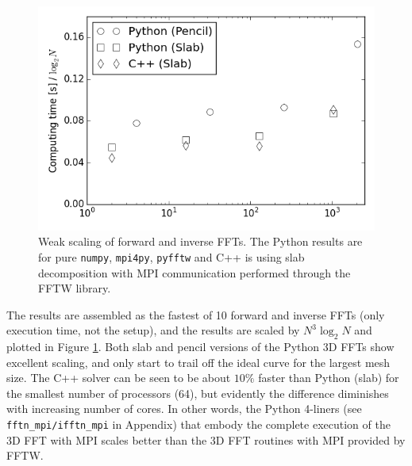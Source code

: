 \documentclass[11pt, oneside]{article}
\newcommand{\inpyth}{\lstinline[keywordstyle={}, basicstyle=\ttfamily]} %[]%
\begin{document}


\begin{figure}
\centering
\includegraphics[scale=0.6]{figs/weak_scaling_fft_1024.png}
\caption{Weak scaling of forward and inverse FFTs. The Python results are for pure \texttt{numpy}, \texttt{mpi4py}, \texttt{pyfftw} and C++ is using slab decomposition with MPI communication performed through the FFTW library.}
\label{fig:weak_FFT_scaling}
\end{figure}

The results are assembled as the fastest of 10 forward and inverse FFTs (only execution time, not the setup), and the results
are scaled by $N^3 \log_2N$ and plotted in Figure \ref{fig:weak_FFT_scaling}. Both slab and pencil versions of the Python 3D FFTs show excellent scaling,
and only start to trail off the ideal curve for the largest mesh size. The C++ solver can be seen to be about $10 \%$ faster than Python (slab) for the smallest number of processors (64), but evidently the difference diminishes with increasing number of cores. In other words, the Python 4-liners (see \inpyth{fftn_mpi/ifftn_mpi} in Appendix) that embody the complete execution of the 3D FFT with MPI scales better than the 3D FFT routines with MPI provided by FFTW.  
\end{document}
